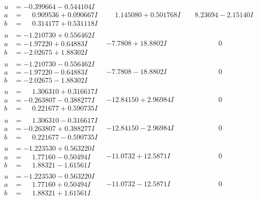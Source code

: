 \documentclass[1p]{elsarticle_modified}
\theoremstyle{definition}
\begin{document}
$$\begin{array}{c|c|c}
\begin{aligned}
u &= -0.399664 - 0.544104 I \\
a &= \phantom{-}0.909536 + 0.090667 I \\
b &= \phantom{-}0.314177 + 0.531118 I\end{aligned}
 & \phantom{-}1.145080 + 0.501768 I & \phantom{-}8.23694 - 2.15140 I \\ \hline\begin{aligned}
u &= -1.210730 + 0.556462 I \\
a &= -1.97220 + 0.64883 I \\
b &= -2.02675 + 1.88302 I\end{aligned}
 & -7.7808 + 18.8802 I & \phantom{-0.000000 } 0 \\ \hline\begin{aligned}
u &= -1.210730 - 0.556462 I \\
a &= -1.97220 - 0.64883 I \\
b &= -2.02675 - 1.88302 I\end{aligned}
 & -7.7808 - 18.8802 I & \phantom{-0.000000 } 0 \\ \hline\begin{aligned}
u &= \phantom{-}1.306310 + 0.316617 I \\
a &= -0.263807 - 0.388277 I \\
b &= \phantom{-}0.221677 + 0.590735 I\end{aligned}
 & -12.84150 + 2.96984 I & \phantom{-0.000000 } 0 \\ \hline\begin{aligned}
u &= \phantom{-}1.306310 - 0.316617 I \\
a &= -0.263807 + 0.388277 I \\
b &= \phantom{-}0.221677 - 0.590735 I\end{aligned}
 & -12.84150 - 2.96984 I & \phantom{-0.000000 } 0 \\ \hline\begin{aligned}
u &= -1.223530 + 0.563220 I \\
a &= \phantom{-}1.77160 - 0.50494 I \\
b &= \phantom{-}1.88321 - 1.61561 I\end{aligned}
 & -11.0732 + 12.5871 I & \phantom{-0.000000 } 0 \\ \hline\begin{aligned}
u &= -1.223530 - 0.563220 I \\
a &= \phantom{-}1.77160 + 0.50494 I \\
b &= \phantom{-}1.88321 + 1.61561 I\end{aligned}
 & -11.0732 - 12.5871 I & \phantom{-0.000000 } 0 \\ \hline\begin{aligned}

\end{aligned}
\end{array}$$
\end{document}
